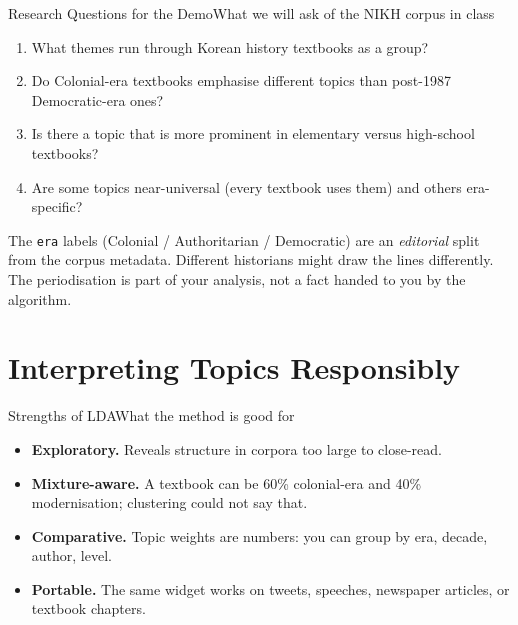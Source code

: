 \documentclass[aspectratio=169,10pt]{beamer}
\begin{document}
\begin{frame}{Research Questions for the Demo}{What we will ask of the NIKH corpus in class}
  \begin{enumerate}
    \item What themes run through Korean history textbooks as a group?
    \item Do Colonial-era textbooks emphasise different topics than post-1987 Democratic-era ones?
    \item Is there a topic that is more prominent in elementary versus high-school textbooks?
    \item Are some topics near-universal (every textbook uses them) and others era-specific?
  \end{enumerate}

  \vspace{0.6em}
  \begin{callcoral}
    The \texttt{era} labels (Colonial / Authoritarian / Democratic) are an \emph{editorial} split
    from the corpus metadata. Different historians might draw the lines differently.
    The periodisation is part of your analysis, not a fact handed to you by the algorithm.
  \end{callcoral}
\end{frame}

\section{Interpreting Topics Responsibly}

\begin{frame}{Strengths of LDA}{What the method is good for}
  \begin{itemize}
    \item \textbf{Exploratory.} Reveals structure in corpora too large to close-read.
    \item \textbf{Mixture-aware.} A textbook can be 60\% colonial-era and 40\% modernisation; clustering could not say that.
    \item \textbf{Comparative.} Topic weights are numbers: you can group by era, decade, author, level.
    \item \textbf{Portable.} The same widget works on tweets, speeches, newspaper articles, or textbook chapters.
  \end{itemize}
\end{frame}
\end{document}
